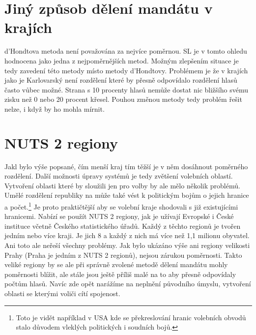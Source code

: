 \documentclass[12pt]{report}
\begin{document}
\section{Jiný způsob dělení mandátu v krajích} d'Hondtova metoda není považována za nejvíce poměrnou.
SL je v tomto ohledu hodnocena jako jedna z nejpoměrnějších metod.\autocite{BEN} Možným zlepšením situace je tedy zavedení této metody místo metody d'Hondtovy.
Problémem je že v krajích jako je Karlovarský není rozdělení které by přesně odpovídalo rozdělení hlasů často vůbec možné.
Strana s 10 procenty hlasů nemůže dostat nic bližšího svému zisku než 0 nebo 20 procent křesel.
Pouhou změnou metody tedy problém řešit nelze, i když by ho mohla mírnit.
\section{NUTS 2 regiony} Jakl bylo výše popsané, čím menší kraj tím těžší je v něm dosáhnout poměrného rozdělení.
Další možnosti úpravy systémů je tedy zvětšení volebních oblastí.
Vytvoření oblasti které by sloužili jen pro volby by ale mělo několik problémů.
Umělé rozdělení republiky na  může také vést k politickým bojům o jejich hranice a počet.\footnote{Toto je vidět například v USA kde se překreslování hranic volebních obvodů stalo důvodem vleklých politických i soudních bojů.} Je proto praktičtější aby se volební kraje shodovali s již existujícími hranicemi.
Nabízí se použít NUTS 2 regiony, jak je užívají Evropské i České instituce včetně Českého statistického úřadů.
Každý z těchto regionů je tvořen jedním nebo více kraji.
Je jich 8 a každý z nich má více než 1,1 milionu obyvatel.
Ani toto ale neřeší všechny problémy.
Jak bylo ukázáno výše ani regiony velikosti Prahy (Praha je jedním z NUTS 2 regionů), nejsou zárukou poměrnosti.
Takto veliké regiony by se ale při správně zvolené metodě dělení mandátu mohly poměrnosti blížit, ale stále jsou ještě příliš malé na to aby přesně odpovídaly počtům hlasů.
Navíc zde opět narážíme na neplnění původního úmyslu, vytvoření oblasti se kterými voliči cítí spojenost.
\end{document}
